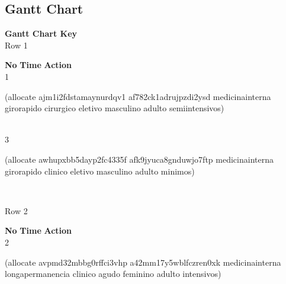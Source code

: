 \documentclass[a4paper,12pt]{article}
\newcommand{\action}[1]{{\sf #1}}
\newcommand{\listrowg}[1]{\begin{minipage}[t]{10cm} #1 \end{minipage}}
\begin{document}
\subsection{Gantt Chart}
{\bf Gantt Chart Key}\\
Row 1
\begin{tabbing}
{\bf No} \qquad \= {\bf Time} \qquad \= {\bf Action} \\
1  \> \listrowg{\action{(allocate ajm1i2fdstamaynurdqv1 af782ck1adrujpzdi2ysd medicinainterna girorapido cirurgico eletivo masculino adulto semiintensivos)}} \\
3  \> \listrowg{\action{(allocate awhupxbb5dayp2fc4335f afk9jyuca8gnduwjo7ftp medicinainterna girorapido clinico eletivo masculino adulto minimos)}} \\
\end{tabbing}
Row 2
\begin{tabbing}
{\bf No} \qquad \= {\bf Time} \qquad \= {\bf Action} \\
2  \> \listrowg{\action{(allocate avpmd32mbbg0rffci3vhp a42mm17y5wblfczren0xk medicinainterna longapermanencia clinico agudo feminino adulto intensivos)}} \\
\end{tabbing}
\end{document}
